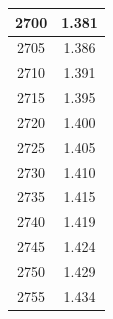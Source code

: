\documentclass[a4paper]{article}
\begin{document}
\begin{tabular}{|c|c|}
		\hline
		2700 & 1.381 \\
		\hline
		2705 & 1.386 \\
		\hline
		2710 & 1.391 \\
		\hline
		2715 & 1.395 \\
		\hline
		2720 & 1.400 \\
		\hline
		2725 & 1.405 \\
		\hline
		2730 & 1.410 \\
		\hline
		2735 & 1.415 \\
		\hline
		2740 & 1.419 \\
		\hline
		2745 & 1.424 \\
		\hline
		2750 & 1.429 \\
		\hline
		2755 & 1.434 \\
		\hline
	\end{tabular}
	\hfill
\end{document}
